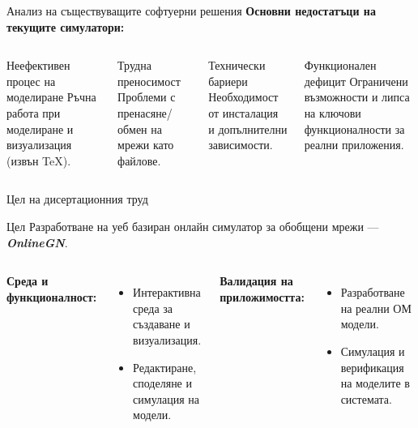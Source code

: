 \documentclass[aspectratio=169]{beamer}
\begin{document}
\begin{frame}{Анализ на съществуващите софтуерни решения}
  \textbf{Основни недостатъци на текущите симулатори:}
  \vspace{0.2cm}

  \begin{columns}[T, totalwidth=\textwidth]
      \begin{block}{Неефективен процес на моделиране}
        \small 
        Ръчна работа при моделиране и визуализация (извън \TeX).
      \end{block}

      \begin{block}{Трудна преносимост}
        \small 
        Проблеми с пренасяне/обмен на мрежи като файлове.
      \end{block}

      \begin{block}{Технически бариери}
        \small 
        Необходимост от инсталация и допълнителни зависимости.
      \end{block}

      \begin{block}{Функционален дефицит}
        \small 
        Ограничени възможности и липса на ключови функционалности за реални приложения.
      \end{block}
  \end{columns}
\end{frame}

\begin{frame}{Цел на дисертационния труд}
  
  \begin{block}{Цел}
    \centering \vspace{0.2cm} \large
    Разработване на уеб базиран онлайн симулатор за обобщени мрежи --- \textbf{\textit{OnlineGN}}.
    \vspace{0.2cm}
  \end{block}

  \vspace{0.4cm}

  \begin{columns}[t]
    \textbf{\color{mainblue}Среда и функционалност:}
    \begin{itemize}
      \item Интерактивна среда за създаване и визуализация.
      \item Редактиране, споделяне и симулация на модели.
    \end{itemize}

    \textbf{\color{mainblue}Валидация на приложимостта:}
    \begin{itemize}
      \item Разработване на реални ОМ модели.
      \item Симулация и верификация на моделите в системата.
    \end{itemize}
  \end{columns}
\end{frame}
\end{document}
